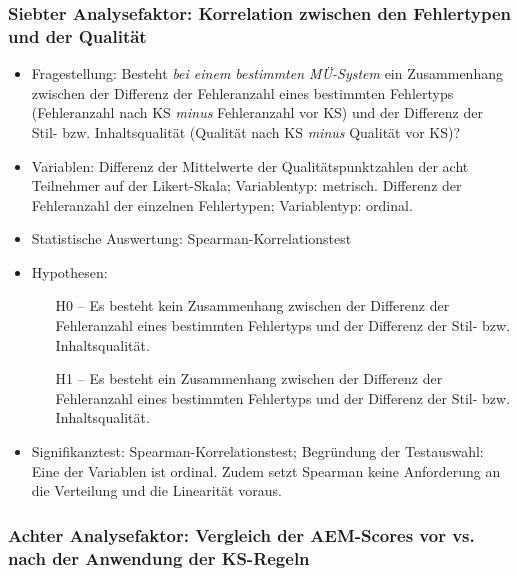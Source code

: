 \subsubsection*{Siebter Analysefaktor: Korrelation zwischen den Fehlertypen und der Qualität}

\begin{itemize}
\item Fragestellung: Besteht \textit{bei einem bestimmten MÜ-System} ein Zusammenhang zwischen der Differenz der Fehleranzahl eines bestimmten Fehlertyps (Fehleranzahl nach KS \textit{minus} Fehleranzahl vor KS) und der Differenz der Stil- bzw. Inhaltsqualität (Qualität nach KS \textit{minus} Qualität vor KS)?

\item Variablen: Differenz der Mittelwerte der Qualitätspunktzahlen der acht Teilnehmer auf der Likert-Skala; Variablentyp: metrisch. Differenz der Fehleranzahl der einzelnen Fehlertypen; Variablentyp: ordinal.

\item Statistische Auswertung: Spearman-Korrelationstest

\item Hypothesen:

\begin{itemize}

\item[H0 --] Es besteht kein Zusammenhang zwischen der Differenz der Fehleranzahl eines bestimmten Fehlertyps und der Differenz der Stil- bzw. Inhaltsqualität.

\item[H1 --] Es besteht ein Zusammenhang zwischen der Differenz der Fehleranzahl eines bestimmten Fehlertyps und der Differenz der Stil- bzw. Inhaltsqualität.

\end{itemize}
\item Signifikanztest: Spearman-Korrelationstest; Begründung der Testauswahl: Eine der Variablen ist ordinal. Zudem setzt Spearman keine Anforderung an die Verteilung und die Linearität voraus.

\end{itemize}

\subsubsection*{Achter Analysefaktor: Vergleich der AEM-Scores vor vs. nach der Anwendung der KS-Regeln}

